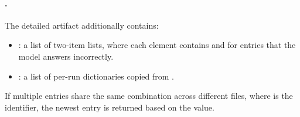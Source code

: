\documentclass[11pt]{article}
\begin{document}
\paragraph{\texorpdfstring{}{<row\_slug>.json}.}
The detailed artifact additionally contains:
\begin{itemize}
  \item {}: a list of two-item lists, where each element contains  and \termRunID for entries that the model answers incorrectly.
  \item {}: a list of per-run dictionaries copied from .
\end{itemize}

If multiple entries share the same  combination across different  files, where  is the \termSimulator identifier, the newest entry is returned based on the  value.
\end{document}
